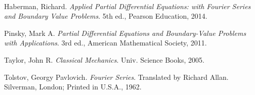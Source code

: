 \documentclass[12pt,letterpaper]{article}
\begin{document}
\paragraph*{}



\begin{thebibliography}{9}


Haberman, Richard. \textit{Applied Partial Differential Equations: with Fourier Series and Boundary Value Problems}. 5th ed., Pearson Education, 2014.

Pinsky, Mark A. \textit{Partial Differential Equations and Boundary-Value Problems with Applications}. 3rd ed., American Mathematical Society, 2011.

Taylor, John R. \textit{Classical Mechanics}. Univ. Science Books, 2005.

Tolstov, Georgy Pavlovich. \textit{Fourier Series}. Translated by Richard Allan. Silverman, London; Printed in U.S.A., 1962.

\end{thebibliography}

\end{document}
